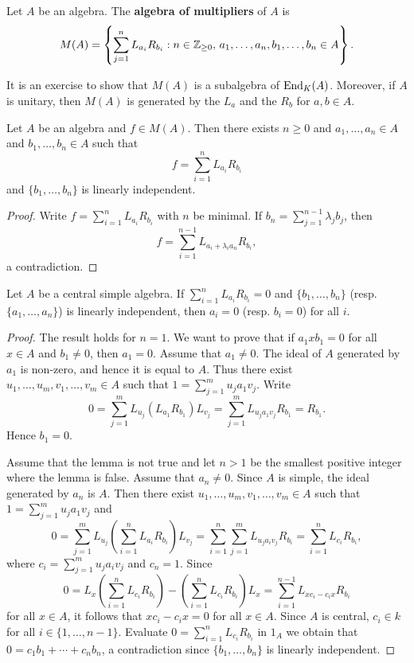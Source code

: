 \begin{definition}
	Let $A$ be an algebra. The \textbf{algebra of multipliers} of $A$ 
	is 
	\[
		M(A)=\left\{\sum_{j=1}^n L_{a_i}R_{b_i}:n\in\mathbb{Z}_{\geq0},\,a_1,\dots,a_n,b_1,\dots,b_n\in A\right\}.
	\]
\end{definition}

It is an exercise to show that $M(A)$ is a subalgebra of $\operatorname{End}_K(A)$. Moreover,
if $A$ is unitary, then $M(A)$ is generated by the $L_a$ and the $R_b$ for 
$a,b\in A$.

\begin{lemma}
	\label{lem:SkolemNoether}
	Let $A$ be an algebra and  
	$f\in M(A)$. Then there exists $n\geq0$ and 
	$a_1,\dots,a_n\in A$ and $b_1,\dots,b_n\in A$ such that 
	\[
		f=\sum_{i=1}^n L_{a_i}R_{b_i}
	\]
	and $\{b_1,\dots,b_n\}$ is linearly independent. 
\end{lemma}

\begin{proof}
    Write $f=\sum_{i=1}^n L_{a_i}R_{b_i}$ with $n$ be minimal. If 
    $b_n=\sum_{j=1}^{n-1}\lambda_jb_j$, then
    \[
    f=\sum_{i=1}^{n-1}L_{a_i+\lambda_ia_n}R_{b_i},
    \]
    a contradiction.
\end{proof}

\begin{lemma}
    \label{lem:SkolemNoether1}
    Let $A$ be a central simple algebra. 
    If $\sum_{i=1}^n L_{a_i}R_{b_i}=0$ and $\{b_1,\dots,b_n\}$ 
    (resp. $\{a_1,\dots,a_n\}$) is linearly independent, 
    then $a_i=0$ (resp. $b_i=0$) for all $i$.
\end{lemma}

\begin{proof}
The result holds for $n=1$. We want to prove that 
if  $a_1xb_1=0$ for all $x\in A$ and $b_1\ne0$, then
	$a_1=0$. Assume that $a_1\ne 0$. The ideal of $A$ generated by 
	$a_1$ is non-zero, and hence it is equal to $A$. Thus there exist 
	$u_1,\dots,u_m,v_1,\dots,v_m\in A$ such that $1=\sum_{j=1}^m u_ja_1v_j$.
	Write  
	\[
		0=\sum_{j=1}^m L_{u_j}(L_{a_1}R_{b_1})L_{v_j}
        =\sum_{j=1}^m L_{u_ja_1v_j}R_{b_1}=R_{b_1}.
	\]
	Hence $b_1=0$. 

	Assume that the lemma is not true and let $n>1$ be the smallest positive
 integer where the lemma is false. 
    Assume that $a_n\ne 0$. Since $A$ is simple, the ideal generated by 
	 $a_n$ is $A$. Then there exist 
  	$u_1,\dots,u_m,v_1,\dots,v_m\in A$ such that $1=\sum_{j=1}^m u_ja_1v_j$ and 
	\[
		0=\sum_{j=1}^m L_{u_j}\left(\sum_{i=1}^n L_{a_i}R_{b_i}\right)L_{v_j}=\sum_{i=1}^n\sum_{j=1}^m L_{u_ja_iv_j}R_{b_i}=\sum_{i=1}^n L_{c_i}R_{b_i},
	\]
	where $c_i=\sum_{j=1}^m u_ja_iv_j$ and $c_n=1$. Since 
	\[
		0=L_x\left(\sum_{i=1}^n L_{c_i}R_{b_i}\right)-\left(\sum_{i=1}^n L_{c_i}R_{b_i}\right)L_x=\sum_{i=1}^{n-1}L_{xc_i-c_ix}R_{b_i}
	\]
	for all $x\in A$, it follows that $xc_i-c_ix=0$ for all 
	 $x\in A$. Since $A$ is central, $c_i\in k$ for all
	$i\in\{1,\dots,n-1\}$. Evaluate $0=\sum_{i=1}^n L_{c_i}R_{b_i}$ in $1_A$
	we obtain that $0=c_1b_1+\cdots+c_nb_n$, a contradiction since 
	$\{b_1,\dots,b_n\}$ is linearly independent. 
\end{proof}

